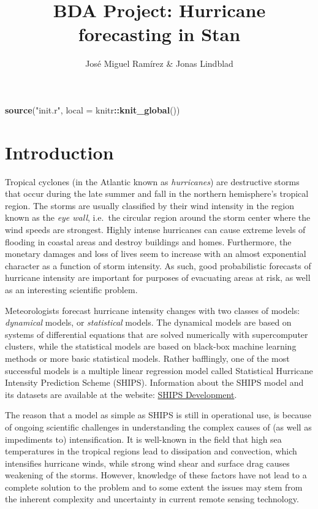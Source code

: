 \documentclass[
]{article}
\title{BDA Project: Hurricane forecasting in Stan}
\author{José Miguel Ramírez \& Jonas Lindblad}
\date{}
\newenvironment{Shaded}{\begin{snugshade}}{\end{snugshade}}
\newcommand{\DataTypeTok}[1]{\textcolor[rgb]{0.13,0.29,0.53}{#1}}
\newcommand{\KeywordTok}[1]{\textcolor[rgb]{0.13,0.29,0.53}{\textbf{#1}}}
\newcommand{\NormalTok}[1]{#1}
\newcommand{\OperatorTok}[1]{\textcolor[rgb]{0.81,0.36,0.00}{\textbf{#1}}}
\newcommand{\StringTok}[1]{\textcolor[rgb]{0.31,0.60,0.02}{#1}}
\begin{document}
\maketitle

{
\setcounter{tocdepth}{1}
\tableofcontents
}
\begin{Shaded}
\begin{Highlighting}[]
\KeywordTok{source}\NormalTok{(}\StringTok{"init.r"}\NormalTok{, }\DataTypeTok{local =}\NormalTok{ knitr}\OperatorTok{::}\KeywordTok{knit_global}\NormalTok{())}
\end{Highlighting}
\end{Shaded}

\hypertarget{introduction}{%
\section{Introduction}\label{introduction}}

Tropical cyclones (in the Atlantic known as \emph{hurricanes}) are
destructive storms that occur during the late summer and fall in the
northern hemisphere's tropical region. The storms are usually classified
by their wind intensity in the region known as the \emph{eye wall},
i.e.~the circular region around the storm center where the wind speeds
are strongest. Highly intense hurricanes can cause extreme levels of
flooding in coastal areas and destroy buildings and homes. Furthermore,
the monetary damages and loss of lives seem to increase with an almost
exponential character as a function of storm intensity. As such, good
probabilistic forecasts of hurricane intensity are important for
purposes of evacuating areas at risk, as well as an interesting
scientific problem.

Meteorologists forecast hurricane intensity changes with two classes of
models: \emph{dynamical} models, or \emph{statistical} models. The
dynamical models are based on systems of differential equations that are
solved numerically with supercomputer clusters, while the statistical
models are based on black-box machine learning methods or more basic
statistical models. Rather bafflingly, one of the most successful models
is a multiple linear regression model called Statistical Hurricane
Intensity Prediction Scheme (SHIPS). Information about the SHIPS model
and its datasets are available at the website:
\href{http://rammb.cira.colostate.edu/research/tropical_cyclones/ships/index.asp}{SHIPS
Development}.

The reason that a model as simple as SHIPS is still in operational use,
is because of ongoing scientific challenges in understanding the complex
causes of (as well as impediments to) intensification. It is well-known
in the field that high sea temperatures in the tropical regions lead to
dissipation and convection, which intensifies hurricane winds, while
strong wind shear and surface drag causes weakening of the storms.
However, knowledge of these factors have not lead to a complete solution
to the problem and to some extent the issues may stem from the inherent
complexity and uncertainty in current remote sensing technology.
\end{document}
